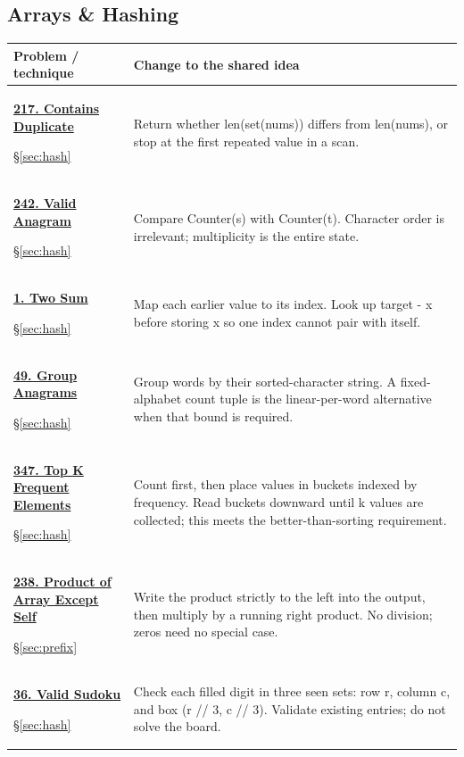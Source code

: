 \documentclass[11pt]{article}
\newcommand{\sect}[1]{\hyperref[sec:#1]{\S\ref*{sec:#1}}}
\begin{document}
\subsection{Arrays \& Hashing}
\begin{longtable}{@{}L{4.3cm}L{11.7cm}@{}}
\toprule Problem / technique & Change to the shared idea \\ \midrule\endhead
\hypertarget{lc217}{}\href{https://leetcode.com/problems/contains-duplicate/}{\textbf{217. Contains Duplicate}}\par\sect{hash} & Return whether len(set(nums)) differs from len(nums), or stop at the first repeated value in a scan.\\[4pt]
\hypertarget{lc242}{}\href{https://leetcode.com/problems/valid-anagram/}{\textbf{242. Valid Anagram}}\par\sect{hash} & Compare Counter(s) with Counter(t). Character order is irrelevant; multiplicity is the entire state.\\[4pt]
\hypertarget{lc1}{}\href{https://leetcode.com/problems/two-sum/}{\textbf{1. Two Sum}}\par\sect{hash} & Map each earlier value to its index. Look up target - x before storing x so one index cannot pair with itself.\\[4pt]
\hypertarget{lc49}{}\href{https://leetcode.com/problems/group-anagrams/}{\textbf{49. Group Anagrams}}\par\sect{hash} & Group words by their sorted-character string. A fixed-alphabet count tuple is the linear-per-word alternative when that bound is required.\\[4pt]
\hypertarget{lc347}{}\href{https://leetcode.com/problems/top-k-frequent-elements/}{\textbf{347. Top K Frequent Elements}}\par\sect{hash} & Count first, then place values in buckets indexed by frequency. Read buckets downward until k values are collected; this meets the better-than-sorting requirement.\\[4pt]
\hypertarget{lc238}{}\href{https://leetcode.com/problems/product-of-array-except-self/}{\textbf{238. Product of Array Except Self}}\par\sect{prefix} & Write the product strictly to the left into the output, then multiply by a running right product. No division; zeros need no special case.\\[4pt]
\hypertarget{lc36}{}\href{https://leetcode.com/problems/valid-sudoku/}{\textbf{36. Valid Sudoku}}\par\sect{hash} & Check each filled digit in three seen sets: row r, column c, and box (r // 3, c // 3). Validate existing entries; do not solve the board.\\[4pt]

\end{longtable}
\end{document}
